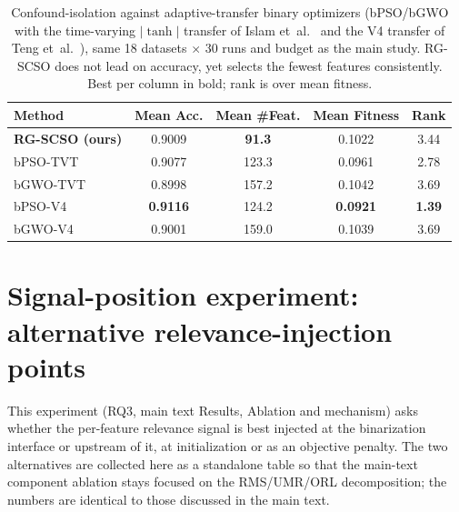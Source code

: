 \documentclass[9pt]{article}
\begin{document}
\begin{table}[t]
\centering
\caption{Confound-isolation against adaptive-transfer binary optimizers (bPSO/bGWO with the time-varying $|\tanh|$ transfer of Islam et~al.~\cite{islam2017tvtf} and the V4 transfer of Teng et~al.~\cite{teng2017avbpso}), same 18 datasets $\times$ 30 runs and budget as the main study. RG-SCSO does not lead on accuracy, yet selects the fewest features consistently. Best per column in bold; rank is over mean fitness.}
\label{tab:adaptive}
\footnotesize
\begin{tabular}{lcccc}
\toprule
Method & Mean Acc. & Mean \#Feat. & Mean Fitness & Rank \\
\midrule
\textbf{RG-SCSO (ours)} & 0.9009 & \textbf{91.3} & 0.1022 & 3.44 \\
bPSO-TVT & 0.9077 & 123.3 & 0.0961 & 2.78 \\
bGWO-TVT & 0.8998 & 157.2 & 0.1042 & 3.69 \\
bPSO-V4 & \textbf{0.9116} & 124.2 & \textbf{0.0921} & \textbf{1.39} \\
bGWO-V4 & 0.9001 & 159.0 & 0.1039 & 3.69 \\
\bottomrule
\end{tabular}
\end{table}


\FloatBarrier
\section{Signal-position experiment: alternative relevance-injection points}
This experiment (RQ3, main text Results, Ablation and mechanism) asks whether
the per-feature relevance signal is best injected at the binarization
interface or upstream of it, at initialization or as an objective penalty.
The two alternatives are collected here as a standalone table so that the
main-text component ablation stays focused on the RMS/UMR/ORL decomposition;
the numbers are identical to those discussed in the main text.
\end{document}
